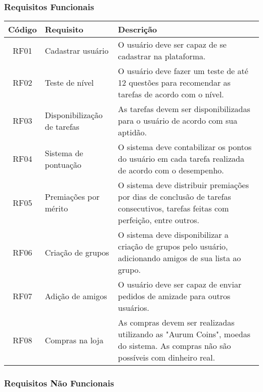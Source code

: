 \documentclass[
	article,			%
	12pt,				%
	oneside,			%
	a4paper,			%
	english,			%
	brazil,				%
	sumario=tradicional
	]{abntex2}
\begin{document}
\subsubsection{Requisitos Funcionais}

\begin{center}
\begin{tabular}{|c|l|p{6cm}|}
\hline
\textbf{Código} & \textbf{Requisito} & \textbf{Descrição} \\
\hline
RF01 & Cadastrar usuário & O usuário deve ser capaz de se cadastrar na plataforma.\\
\hline
RF02 & Teste de nível & O usuário deve fazer um teste de até 12 questões para recomendar as tarefas de acordo com o nível.\\
\hline
RF03 & Disponibilização de tarefas & As tarefas devem ser disponibilizadas para o usuário de acordo com sua aptidão. \\
\hline
RF04 & Sistema de pontuação & O sistema deve contabilizar os pontos do usuário em cada tarefa realizada de acordo com o desempenho. \\
\hline
RF05 & Premiações por mérito & O sistema deve distribuir premiações por dias de conclusão de tarefas consecutivos, tarefas feitas com perfeição, entre outros. \\
\hline
RF06 & Criação de grupos & O sistema deve disponibilizar a criação de grupos pelo usuário, adicionando amigos de sua lista ao grupo. \\
\hline
RF07 & Adição de amigos & O usuário deve ser capaz de enviar pedidos de amizade para outros usuários. \\
\hline
RF08 & Compras na loja & As compras devem ser realizadas utilizando as "Aurum Coins", moedas do sistema. As compras não são possíveis com dinheiro real. \\
\hline
\end{tabular}
\end{center}


\subsubsection{Requisitos Não Funcionais}
\end{document}
